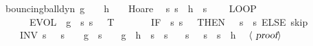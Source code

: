\documentclass[envcountsame]{llncs}
\begin{document}
\begin{example}
\begin{isabellebody}
\isanewline
{}\isamarkupfalse%
\ bouncing{\isacharunderscore}ball{\isacharunderscore}dyn{\isacharcolon}\ {\isachardoublequoteopen}g\ {\isacharless}\ {}\ {\isasymLongrightarrow}\ h\ {\isasymge}\ {}\ {\isasymLongrightarrow}\ Hoare\isanewline
\ \ {\isasymlceil}{\isasymlambda}s{\isachardot}\ s{\isachardollar}{}\ {\isacharequal}\ h\ {\isasymand}\ s{\isachardollar}{}\ {\isacharequal}\ {}{\isasymrceil}\isanewline
\ \ {\isacharparenleft}LOOP\ \isanewline
\ \ \ \ \ \ {\isacharparenleft}{\isacharparenleft}EVOL\ {\isacharparenleft}{\isasymphi}\ g{\isacharparenright}\ {\isacharparenleft}{\isasymlambda}\ s{\isachardot}\ s{\isachardollar}{}\ {\isasymge}\ {}{\isacharparenright}\ T{\isacharparenright}{\isacharsemicolon}\isanewline
\ \ \ \ \ \ \ {\isacharparenleft}IF\ {\isacharparenleft}{\isasymlambda}\ s{\isachardot}\ s{\isachardollar}{}\ {\isacharequal}\ {}{\isacharparenright}\ THEN\ {\isacharparenleft}{}\ {\isacharcolon}{\isacharcolon}{\isacharequal}\ {\isacharparenleft}{\isasymlambda}s{\isachardot}\ {\isacharminus}\ s{\isachardollar}{}{\isacharparenright}{\isacharparenright}\ ELSE\ skip{\isacharparenright}{\isacharparenright}\ \isanewline
\ \ \ \ INV\ {\isacharparenleft}{\isasymlambda}s{\isachardot}\ {}\ {\isasymle}\ s{\isachardollar}{}\ {\isasymand}\ {}\ {\isasymcdot}\ g\ {\isasymcdot}\ s{\isachardollar}{}\ {\isacharequal}\ {}\ {\isasymcdot}\ g\ {\isasymcdot}\ h\ {\isacharplus}\ s{\isachardollar}{}\ {\isasymcdot}\ s{\isachardollar}{}{\isacharparenright}\isanewline
\ \ {\isacharparenright}\ {\isasymlceil}{\isasymlambda}s{\isachardot}\ {}\ {\isasymle}\ s{\isachardollar}{}\ {\isasymand}\ s{\isachardollar}{}\ {\isasymle}\ h{\isasymrceil}{\isachardoublequoteclose}\isanewline
\ \ $\langle \isa{proof}\rangle$\isanewline
\end{isabellebody}


\end{example}
\end{document}

